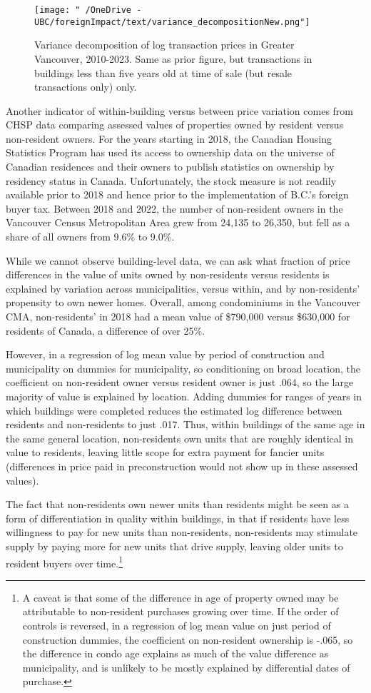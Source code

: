 \documentclass[12pt]{article}
\begin{document}
\begin{figure}
	\caption{\label{fig:varianceDecompositionNew} Variance decomposition of log transaction prices in Greater Vancouver, 2010-2023. Same as prior figure, but transactions in buildings less than five years old at time of sale (but resale transactions only) only.}
\texttt{[image: "~/OneDrive - UBC/foreignImpact/text/variance\_decompositionNew.png"]}
\end{figure}

Another indicator of within-building versus between price variation comes from
CHSP data comparing assessed values of properties owned by resident versus
non-resident owners. For the years starting in 2018, the Canadian Housing
Statistics Program has used its access to ownership data on the universe of
Canadian residences and their owners to publish statistics on ownership by
residency status in Canada.  Unfortunately, the stock measure is not readily
available prior to 2018 and hence prior to the implementation of B.C.'s foreign
buyer tax.  Between 2018 and 2022, the number of non-resident owners in the
Vancouver Census Metropolitan Area grew from 24,135 to 26,350, but fell as a
share of all owners from 9.6\% to 9.0\%.

While we cannot observe building-level data, we can ask what fraction of price
differences in the value of units owned by non-residents versus residents is
explained by variation across municipalities, versus within, and by
non-residents' propensity to own newer homes. Overall, among condominiums in
the Vancouver CMA, non-residents' in 2018 had a mean value of \$790,000 versus
\$630,000 for residents of Canada, a difference of over 25\%.

However, in a regression of log mean value by period of construction and
municipality on dummies for municipality, so conditioning on broad location,
the coefficient on non-resident owner versus resident owner is just .064, so
the large majority of value is explained by location. Adding dummies for ranges
of years in which buildings were completed reduces the estimated log difference
between residents and non-residents to just .017. Thus, within buildings of the
same age in the same general location, non-residents own units that are roughly
identical in value to residents, leaving little scope for extra payment for
fancier units (differences in price paid in preconstruction would not show up
in these assessed values).

The fact that non-residents own newer units than residents might be seen as a
form of differentiation in quality within buildings, in that if residents have
less willingness to pay for new units than non-residents, non-residents may
stimulate supply by paying more for new units that drive supply, leaving older
units to resident buyers over time.\footnote{A caveat is that some of the
difference in age of property owned may be attributable to non-resident
purchases growing over time. If the order of controls is reversed, in a
regression of log mean value on just period of construction dummies, the
coefficient on non-resident ownership is -.065, so the difference in condo age
explains as much of the value difference as municipality, and is unlikely to be
mostly explained by differential dates of purchase.}
\end{document}
